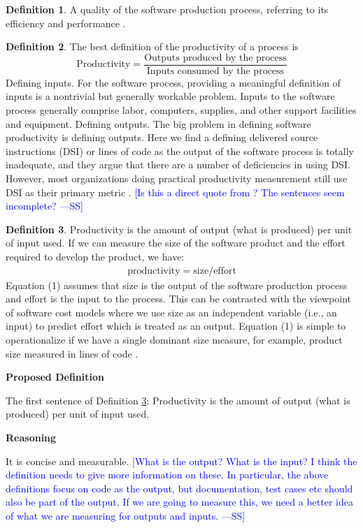 \documentclass[letterpaper,cleveref]{lipics-v2019}
\newcommand{\authornote}[3]{\textcolor{#1}{[#3 ---#2]}}
\newcommand{\authornote}[3]{}
\newcommand{\wss}[1]{\authornote{blue}{SS}{#1}} %
\theoremstyle{definition}
\newtheorem{defn}{Definition}
\begin{document}
\begin{defn}
	A quality of the software production process, referring to its efficiency and
	performance \citep{ghezzi1991fundamentals}.
\end{defn}
\begin{defn}
	The best definition of the productivity of a process is
	\[\text{Productivity} = \dfrac{\text{Outputs produced by the
			process}}{\text{Inputs consumed by the process}}\] Defining inputs. For
	the software process, providing a meaningful definition of inputs is a
	nontrivial but generally workable problem. Inputs to the software process
	generally comprise labor, computers, supplies, and other support facilities and
	equipment. Defining outputs. The big problem in defining software productivity
	is defining outputs. Here we find a defining delivered source instructions (DSI)
	or lines of code as the output of the software process is totally inadequate,
	and they argue that there are a number of deficiencies in using DSI. However,
	most organizations doing practical productivity measurement still use DSI as
	their primary metric \citep{Boehm1987}. \wss{Is this a direct quote from
		\citet{Boehm1987}?  The sentences seem incomplete?}
\end{defn}
\begin{defn}
	\label{ProductivitySelected}
	Productivity is the amount of output (what is produced) per unit of input
	used. If we can measure the size of the software product and the effort required
	to develop the product, we have:
	\begin{align}
	\text{productivity} = \text{size}/\text{effort}
	\end{align}
	Equation (1) assumes that size is the output of the software production process
	and effort is the input to the process. This can be contrasted with the
	viewpoint of software cost models where we use size as an independent variable
	(i.e., an input) to predict effort which is treated as an output. Equation (1)
	is simple to operationalize if we have a single dominant size measure, for
	example, product size measured in lines of code \citep{Kitchenham2004}.
\end{defn}

\noindent \textbf{Proposed Definition} 

The first sentence of Definition \ref{ProductivitySelected}: Productivity is the
amount of output (what is produced) per unit of input used.

\noindent \textbf{Reasoning}

It is concise and measurable. \wss{What is the output?  What is the input?  I
	think the definition needs to give more information on these.  In particular,
	the above definitions focus on code as the output, but documentation, test
	cases etc should also be part of the output.  If we are going to measure this,
	we need a better idea of what we are measuring for outputs and inputs.}
\end{document}
